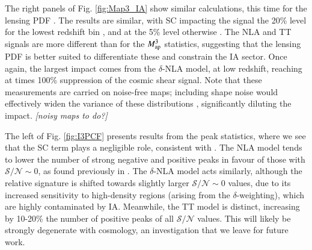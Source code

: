 The right panels of Fig. \ref{fig:Map3_IA}  show similar calculations, this time for the lensing PDF .  The results are similar, with SC impacting the signal  the 20\% level for the lowest redshift bin , and at the 5\% level otherwise . The NLA and TT signals are more different than for the $M_{\rm ap}^3$ statistics, suggesting that the lensing PDF is better suited to differentiate these and constrain the IA sector. Once again, the largest impact comes from the $\delta$-NLA model, at low redshift, reaching at times 100\% suppression of the cosmic shear signal.  Note that these measurements are carried  on noise-free maps; including shape noise would effectively widen the variance of these distributions \citep{LensingPDF}, significantly diluting the impact. 
{\it [noisy maps to do?]} 

The left of Fig. \ref{fig:I3PCF} presents results from the peak statistics, where we see that the SC term plays a negligible role, consistent with \citet{DESY3_Gatti_source_clust}. The NLA model tends to lower the number of strong negative and positive peaks in favour of those with $\mathcal{S/N}\sim 0$, as found previously in \citet{Tidalator}. The $\delta$-NLA model acts similarly, although the relative signature is shifted towards slightly larger $\mathcal{S/N}\sim 0$ values, due to its increased sensitivity to high-density regions (arising from the $\delta$-weighting), which are highly contaminated by IA. Meanwhile, the TT model is distinct, increasing by 10-20\% the number of positive peaks of all  $\mathcal{S/N}$ values. This will likely be strongly degenerate with cosmology, an investigation that we leave for future work.



